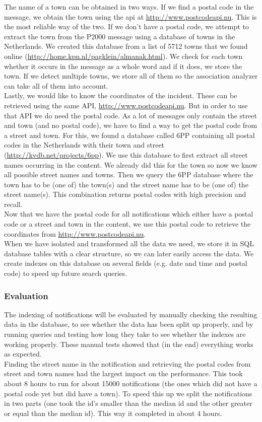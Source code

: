 The name of a town can be obtained in two ways. If we find a postal code in the message, we obtain the town using the api at \url{http://www.postcodeapi.nu}. This is the most reliable way of the two. If we don't have a postal code, we attempt to extract the town from the P2000 message using a database of towns in the Netherlands. We created this database from a list of 5712 towns that we found online (\url{http://home.kpn.nl/pagklein/almanak.html}). We check for each town whether it occurs in the message as a whole word and if it does, we store the town. If we detect multiple towns, we store all of them so the association analyzer can take all of them into account.\\

Lastly, we would like to know the coordinates of the incident. These can be retrieved using the same API, \url{http://www.postcodeapi.nu}. But in order to use that API we do need the postal code. As a lot of messages only contain the street and town (and no postal code), we have to find a way to get the postal code from a street and town. For this, we found a database called 6PP containing all postal codes in the Netherlands with their town and street (\url{http://kvdb.net/projects/6pp}). We use this database to first extract all street names occurring in the content. We already did this for the town so now we know all possible street names and towns. Then we query the 6PP database where the town has to be (one of) the town(s) and the street name has to be (one of) the street name(s). This combination returns postal codes with high precision and recall.\\

Now that we have the postal code for all notifications which either have a postal code or a street and town in the content, we use this postal code to retrieve the coordinates from \url{http://www.postcodeapi.nu}.\\

When we have isolated and transformed all the data we need, we store it in SQL database tables with a clear structure, so we can later easily access the data. We create indexes on this database on several fields (e.g. date and time and postal code) to speed up future search queries.
\subsubsection*{Evaluation}
The indexing of notifications will be evaluated by manually checking the resulting data in the database, to see whether the data has been split up properly, and by running queries and testing how long they take to see whether the indexes are working properly. These manual tests showed that (in the end) everything works as expected.\\

Finding the street name in the notification and retrieving the postal codes from street and town names had the largest impact on the performance. This took about 8 hours to run for about 15000 notifications (the ones which did not have a postal code yet but did have a town). To speed this up we split the notifications in two parts (one took the id's smaller than the median id and the other greater or equal than the median id). This way it completed in about 4 hours.
